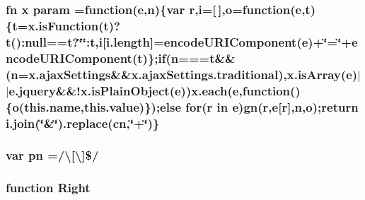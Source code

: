 \subsubsection[{param}]{ {\bf fn} {\bf x} param =function({\bf e},n)\{var r,{\bf i}=\mbox{[}$\,$\mbox{]},{\bf o}=function({\bf e},{\bf t})\{{\bf t}={\bf x.\+is\+Function}({\bf t})?{\bf t}()\+:null=={\bf t}?\char`\"{}\char`\"{}\+:{\bf t},{\bf i}\mbox{[}{\bf i.\+length}\mbox{]}=encode\+U\+R\+I\+Component({\bf e})+\char`\"{}=\char`\"{}+encode\+U\+R\+I\+Component({\bf t})\};{\bf if}(n==={\bf t}\&\&(n={\bf x.\+ajax\+Settings}\&\&x.\+ajax\+Settings.\+traditional),x.\+is\+Array({\bf e})$\vert$$\vert$e.\+jquery\&\&!{\bf x.\+is\+Plain\+Object}({\bf e})){\bf x.\+each}({\bf e},function()\{{\bf o}(this.\+name,this.\+value)\});{\bf else} for(r in {\bf e}){\bf gn}(r,{\bf e}\mbox{[}r\mbox{]},n,{\bf o});return i.\+join(\char`\"{}\&\char`\"{}).replace({\bf cn},\char`\"{}+\char`\"{})\}}\label{packages_2j_query_81_810_82_2_content_2_scripts_2jquery-1_810_82_8min_8js_ae8915303d11557d1b001bc56b6195251}
\hypertarget{packages_2j_query_81_810_82_2_content_2_scripts_2jquery-1_810_82_8min_8js_a6a40831f7c967a457dbbd3b5e6f287d7}{}
\subsubsection[{pn}]{\setlength{\rightskip}{0pt plus 5cm}var pn =/\textbackslash{}\mbox{[}\textbackslash{}\mbox{]}\$/}\label{packages_2j_query_81_810_82_2_content_2_scripts_2jquery-1_810_82_8min_8js_a6a40831f7c967a457dbbd3b5e6f287d7}
\hypertarget{packages_2j_query_81_810_82_2_content_2_scripts_2jquery-1_810_82_8min_8js_ac7f66efc33d974809d85fc5bdb00c6eb}{}
\subsubsection[{Right}]{\setlength{\rightskip}{0pt plus 5cm}function Right}\label{packages_2j_query_81_810_82_2_content_2_scripts_2jquery-1_810_82_8min_8js_ac7f66efc33d974809d85fc5bdb00c6eb}
\hypertarget{packages_2j_query_81_810_82_2_content_2_scripts_2jquery-1_810_82_8min_8js_a23c5666e83bbbceee94adcd0851f50c4}{}
